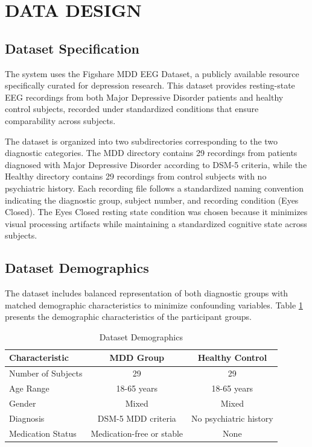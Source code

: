 \section{DATA DESIGN}

\subsection{Dataset Specification}

The system uses the Figshare MDD EEG Dataset, a publicly available resource specifically curated for depression research. This dataset provides resting-state EEG recordings from both Major Depressive Disorder patients and healthy control subjects, recorded under standardized conditions that ensure comparability across subjects.

The dataset is organized into two subdirectories corresponding to the two diagnostic categories. The MDD directory contains 29 recordings from patients diagnosed with Major Depressive Disorder according to DSM-5 criteria, while the Healthy directory contains 29 recordings from control subjects with no psychiatric history. Each recording file follows a standardized naming convention indicating the diagnostic group, subject number, and recording condition (Eyes Closed). The Eyes Closed resting state condition was chosen because it minimizes visual processing artifacts while maintaining a standardized cognitive state across subjects.

\subsection{Dataset Demographics}

The dataset includes balanced representation of both diagnostic groups with matched demographic characteristics to minimize confounding variables. Table \ref{tab:demographics} presents the demographic characteristics of the participant groups.

\begin{table}[H]
    \centering
    \small
    \caption{Dataset Demographics}
    \label{tab:demographics}
    \begin{tabularx}{\textwidth}{|X|c|c|}
        \hline
        \textbf{Characteristic} & \textbf{MDD Group} & \textbf{Healthy Control} \\
        \hline
        Number of Subjects & 29 & 29 \\
        \hline
        Age Range & 18-65 years & 18-65 years \\
        \hline
        Gender & Mixed & Mixed \\
        \hline
        Diagnosis & DSM-5 MDD criteria & No psychiatric history \\
        \hline
        Medication Status & Medication-free or stable & None \\
        \hline
    \end{tabularx}
\end{table}

